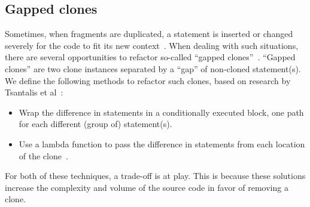 \documentclass[sigconf,review,anonymous]{acmart}
\begin{document}
\subsection{Gapped clones} \label{sec:t3r}
Sometimes, when fragments are duplicated, a statement is inserted or changed severely for the code to fit its new context~\cite{roy2007survey}. When dealing with such situations, there are several opportunities to refactor so-called ``gapped clones''~\cite{ueda2002detection, zhao2018automatic}. ``Gapped clones'' are two clone instances separated by a ``gap'' of non-cloned statement(s). We define the following methods to refactor such clones, based on research by Tsantalis et al~\cite{tsantalis2015assessing}:
\begin{itemize}
  \item Wrap the difference in statements in a conditionally executed block, one path for each different (group of) statement(s).
  \item Use a lambda function to pass the difference in statements from each location of the clone~\cite{tsantalis2017clone}.
\end{itemize}
For both of these techniques, a trade-off is at play. This is because these solutions increase the complexity and volume of the source code in favor of removing a clone.
\end{document}
